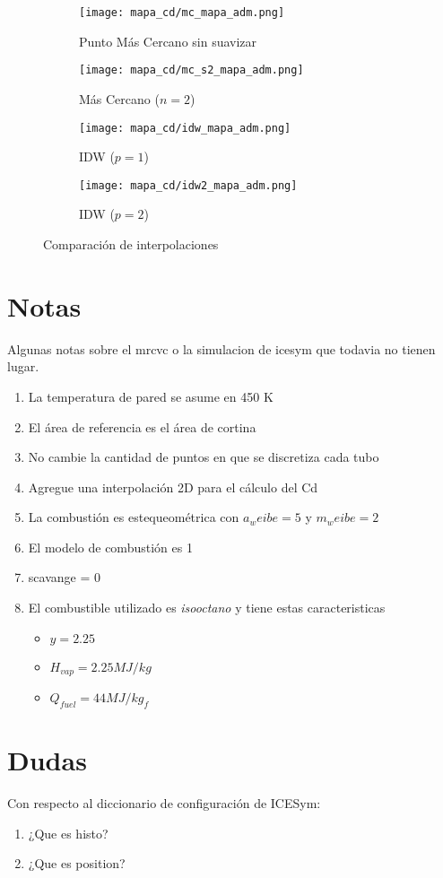 \begin{figure}
    \centering

    \begin{subfigure}{0.4\textwidth}
        \centering
        \texttt{[image: mapa\_cd/mc\_mapa\_adm.png]}
        \caption{Punto Más Cercano sin suavizar}
    \end{subfigure}
    \hfill
    \begin{subfigure}{0.4\textwidth}
        \centering
        \texttt{[image: mapa\_cd/mc\_s2\_mapa\_adm.png]}
        \caption{Más Cercano ($n=2$)}
    \end{subfigure}
    \hfill
    \begin{subfigure}{0.4\textwidth}
        \centering
        \texttt{[image: mapa\_cd/idw\_mapa\_adm.png]}
        \caption{IDW ($p=1$)}
    \end{subfigure}
    \hfill
    \begin{subfigure}{0.4\textwidth}
        \centering
        \texttt{[image: mapa\_cd/idw2\_mapa\_adm.png]}
        \caption{IDW ($p=2$)}
    \end{subfigure}
    \caption{Comparación de interpolaciones}
    \label{fig:mapas_interpolados}
\end{figure}


\section{Notas}
Algunas notas sobre el mrcvc o la simulacion de icesym que todavia no tienen
lugar.

\begin{enumerate}
    \item La temperatura de pared se asume en 450 K
    \item El área de referencia es el área de cortina
    \item No cambie la cantidad de puntos en que se discretiza cada tubo
    \item Agregue una interpolación 2D para el cálculo del Cd
    \item La combustión es estequeométrica con $a_weibe=5$ y $m_weibe=2$
    \item El modelo de combustión es 1
    \item scavange = 0
    \item El combustible utilizado es \emph{isooctano} y tiene estas
        caracteristicas 
        \begin{itemize}
            \item $y = 2.25$
            \item $H_{vap} = 2.25 MJ/kg$
            \item $Q_{fuel} = 44 MJ/kg_f$
        \end{itemize}
\end{enumerate}

\section{Dudas}
Con respecto al diccionario de configuración de ICESym:

\begin{enumerate}
    \item ¿Que es histo?
    \item ¿Que es position?
\end{enumerate}
